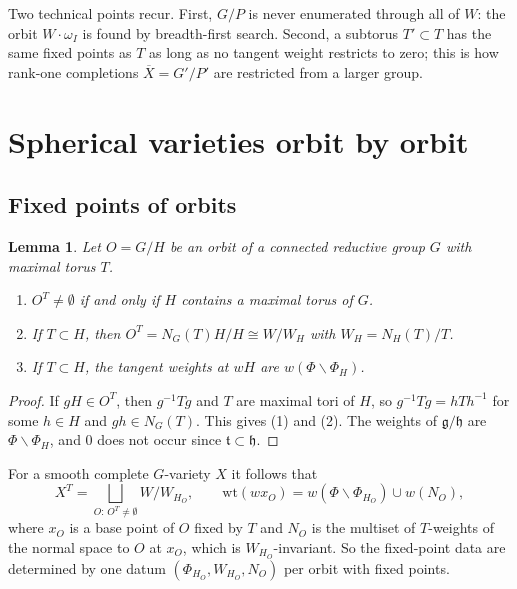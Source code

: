 \documentclass[11pt]{amsart}
\newtheorem{lemma}[theorem]{Lemma}
\theoremstyle{definition}
\theoremstyle{remark}
\newcommand{\wt}{\mathrm{wt}}
\begin{document}
Two technical points recur. First, $G/P$ is never enumerated through all of
$W$: the orbit $W\cdot\omega_I$ is found by breadth-first search. Second, a
subtorus $T'\subset T$ has the same fixed points as $T$ as long as no
tangent weight restricts to zero; this is how rank-one completions
$\overline X = G'/P'$ are restricted from a larger group.

\section{Spherical varieties orbit by orbit}\label{sec:spherical}

\subsection{Fixed points of orbits}
\begin{lemma}\label{lem:orbit}
Let $O = G/H$ be an orbit of a connected reductive group $G$ with maximal
torus $T$.
\begin{enumerate}
\item $O^T\ne\emptyset$ if and only if $H$ contains a maximal torus of $G$.
\item If $T\subset H$, then $O^T = N_G(T)H/H\cong W/W_H$ with
$W_H = N_H(T)/T$.
\item If $T\subset H$, the tangent weights at $wH$ are
$w(\Phi\smallsetminus\Phi_H)$.
\end{enumerate}
\end{lemma}
\begin{proof}
If $gH\in O^T$, then $g^{-1}Tg$ and $T$ are maximal tori of $H$, so
$g^{-1}Tg = hTh^{-1}$ for some $h\in H$ and $gh\in N_G(T)$. This gives (1)
and (2). The weights of $\mathfrak g/\mathfrak h$ are
$\Phi\smallsetminus\Phi_H$, and $0$ does not occur since
$\mathfrak t\subset\mathfrak h$.
\end{proof}

For a smooth complete $G$-variety $X$ it follows that
\[
X^T = \bigsqcup_{O :\, O^T\ne\emptyset} W/W_{H_O},\qquad
\wt(w x_O) = w(\Phi\smallsetminus\Phi_{H_O}) \cup w(N_O),
\]
where $x_O$ is a base point of $O$ fixed by $T$ and $N_O$ is the multiset of
$T$-weights of the normal space to $O$ at $x_O$, which is $W_{H_O}$-invariant.
So the fixed-point data are determined by one datum
$(\Phi_{H_O}, W_{H_O}, N_O)$ per orbit with fixed points.
\end{document}
